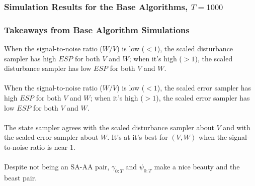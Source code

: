 \documentclass[xcolor=dvipsnames]{beamer}
\begin{document}
\begin{frame}
    \frametitle{Simulation Results for the Base Algorithms, $T=1000$}

\end{frame}

\begin{frame}
  \frametitle{Takeaways from Base Algorithm Simulations}
  When the signal-to-noise ratio ($W/V$) is low ($<1$), the scaled disturbance sampler has high $ESP$ for both $V$ and $W$; when it's high ($>1$), the scaled disturbance sampler has low $ESP$ for both $V$ and $W$.\\~\\
  
  When the signal-to-noise ratio ($W/V$) is low ($<1$), the scaled error sampler has high $ESP$ for both $V$ and $W$; when it's high ($>1$), the scaled error sampler has low $ESP$ for both $V$ and $W$.\\~\\
  
  The state sampler agrees with the scaled disturbance sampler about $V$ and with the scaled error sampler about $W$. It's at it's best for $(V,W)$ when the signal-to-noise ratio is near $1$.\\~\\
  
  Despite not being an SA-AA pair, $\gamma_{0:T}$ and $\psi_{0:T}$ make a nice beauty and the beast pair.
  
\end{frame}
\end{document}
